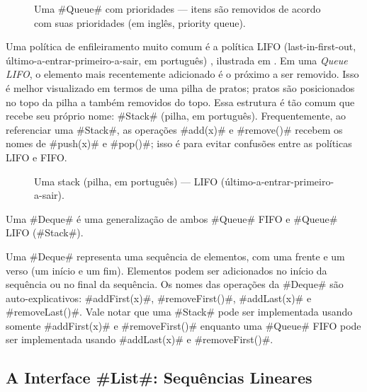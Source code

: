 \begin{figure}
  \caption[Uma fila com prioridades]{Uma #Queue# com prioridades --- itens são removidos de acordo com suas prioridades (em inglês, priority queue).}
\end{figure}


Uma política de enfileiramento muito comum é a política LIFO (last-in-first-out, último-a-entrar-primeiro-a-sair, em português)
%
%
%
%
%
%
, ilustrada em . Em uma \emph{Queue LIFO},
o elemento mais recentemente adicionado é o próximo a ser removido. 
Isso é melhor visualizado em termos de uma pilha de pratos; pratos são 
posicionados no topo da pilha a também removidos do topo. Essa estrutura
é tão comum que recebe seu próprio nome: #Stack# (pilha, em português). Frequentemente, ao referenciar uma #Stack#, as operações #add(x)# e #remove()# 
recebem os nomes de #push(x)# e #pop()#; isso é para evitar confusões entre as políticas LIFO e FIFO.

\begin{figure}
  \caption[Uma stack]{Uma stack (pilha, em português) --- LIFO (último-a-entrar-primeiro-a-sair).}
\end{figure}


Uma #Deque#
%
é uma generalização de ambos #Queue# FIFO e #Queue# LIFO (#Stack#).

Uma #Deque# representa uma sequência de elementos, com uma frente e um verso (um início e um fim). 
Elementos podem ser adicionados no início da sequência ou no final da sequência.
Os nomes das operações da #Deque# são auto-explicativos: 
#addFirst(x)#, #removeFirst()#, #addLast(x)# e #removeLast()#.  
Vale notar que uma #Stack# pode ser implementada usando somente #addFirst(x)#
e #removeFirst()# enquanto uma #Queue# FIFO pode ser implementada usando 
#addLast(x)# e #removeFirst()#.

\subsection{A Interface #List#: Sequências Lineares}

